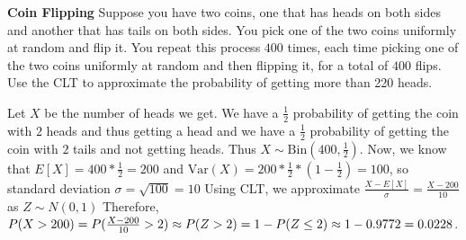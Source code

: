 \question \textbf{Coin Flipping}\newline
Suppose you have two coins, one that has heads on both sides and another that has tails on both sides. You pick one of the two coins uniformly at random and flip it. You repeat this process $400$ times, each time picking one of the two coins uniformly at random and then flipping it, for a total of $400$ flips. \newline 
Use the CLT to approximate the probability of getting more than 220 heads.
\begin{solution}[3cm]
Let $X$ be the number of heads we get. We have a $\frac{1}{2}$ probability of getting the coin with $2$ heads and thus getting a head and we have a $\frac{1}{2}$ probability of getting the coin with $2$ tails and not getting heads. Thus $X \mathtt{\sim} \mathrm{Bin}(400, \frac{1}{2})$. \newline
Now, we know that $E[X] = 400 * \frac{1}{2} = 200$ and $\mathrm{Var}(X) = 200 * \frac{1}{2} * (1-\frac{1}{2}) = 100$, so standard deviation $\sigma = \sqrt{100} = 10$ \newline 
Using CLT, we approximate $\frac{X - E[X]}{\sigma} = \frac{X - 200}{10}$ as $Z \mathtt{\sim}N(0, 1)$ \newline
Therefore, $P(X > 200)  = P(\frac{X - 200}{10} > 2) \approx P(Z > 2) = 1 - P(Z \leq 2) \approx 1 - 0.9772 \\ = 0.0228$.
\end{solution}   
